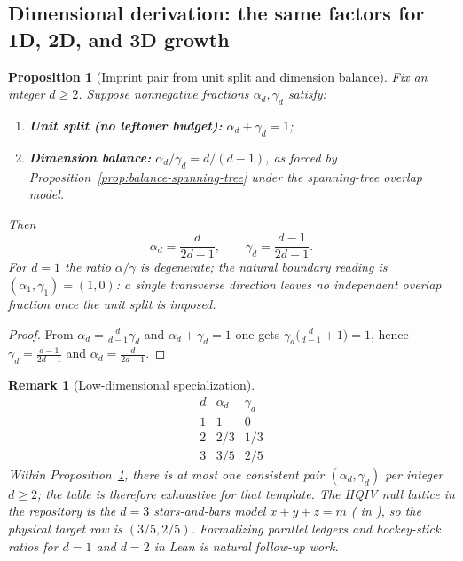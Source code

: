 \documentclass[11pt]{amsart}
\newtheorem{proposition}[theorem]{Proposition}
\newtheorem{remark}[theorem]{Remark}
\begin{document}
\subsection[Dimensional derivation]{Dimensional derivation: the same factors for 1D, 2D, and 3D growth}

\begin{proposition}[Imprint pair from unit split and dimension balance]
\label{prop:dim-split-family}
Fix an integer \(d\ge 2\). Suppose nonnegative fractions \(\alpha_d,\gamma_d\) satisfy:
\begin{enumerate}
  \item \textbf{Unit split (no leftover budget):} \(\alpha_d+\gamma_d=1\);
  \item \textbf{Dimension balance:} \(\alpha_d/\gamma_d = d/(d-1)\), as forced by Proposition~\ref{prop:balance-spanning-tree} under the spanning-tree overlap model.
\end{enumerate}
Then
\[
\alpha_d=\frac{d}{2d-1},\qquad \gamma_d=\frac{d-1}{2d-1}.
\]
For \(d=1\) the ratio \(\alpha/\gamma\) is degenerate; the natural boundary reading is \((\alpha_1,\gamma_1)=(1,0)\): a single transverse direction leaves no independent overlap fraction once the unit split is imposed.
\end{proposition}

\begin{proof}
From \(\alpha_d = \frac{d}{d-1}\gamma_d\) and \(\alpha_d+\gamma_d=1\) one gets \(\gamma_d\bigl(\frac{d}{d-1}+1\bigr)=1\), hence \(\gamma_d=\frac{d-1}{2d-1}\) and \(\alpha_d=\frac{d}{2d-1}\).
\end{proof}

\begin{remark}[Low-dimensional specialization]
\label{rem:dim-table}
\[
\begin{array}{c|cc}
d & \alpha_d & \gamma_d\\\hline
1 & 1 & 0\\
2 & 2/3 & 1/3\\
3 & 3/5 & 2/5
\end{array}
\]
Within Proposition~\ref{prop:dim-split-family}, there is at most one consistent pair \((\alpha_d,\gamma_d)\) per integer \(d\ge 2\); the table is therefore exhaustive for that template. The HQIV null lattice in the repository is the \(d=3\) stars-and-bars model \(x+y+z=m\) ( in ), so the physical target row is \((3/5,2/5)\). Formalizing parallel ledgers and hockey-stick ratios for \(d=1\) and \(d=2\) in Lean is natural follow-up work.
\end{remark}
\end{document}
